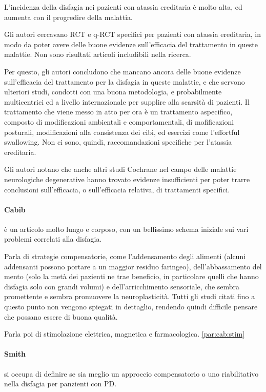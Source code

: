 L'incidenza della disfagia nei pazienti con atassia ereditaria è molto alta, ed 
aumenta con il progredire della malattia.

Gli autori cercavano RCT e q-RCT specifici per pazienti con atassia ereditaria, 
in modo da poter avere delle buone evidenze sull'efficacia del trattamento in 
queste malattie.
Non sono risultati articoli includibili nella ricerca.

Per questo, gli autori concludono che mancano ancora delle buone evidenze 
sull'efficacia del trattamento per la disfagia in queste malattie, e che 
servono ulteriori studi, condotti con una buona metodologia, e probabilmente 
multicentrici ed a livello internazionale per supplire alla scarsità di 
pazienti.
Il trattamento che viene messo in atto per ora è un trattamento aspecifico, 
composto di modificazioni ambientali e comportamentali, di mofificazioni 
posturali, modificazioni alla consistenza dei cibi, ed esercizi come 
l'effortful swallowing.
Non ci sono, quindi, raccomandazioni specifiche per l'atassia ereditaria.

Gli autori notano che anche altri studi Cochrane nel campo delle malattie 
neurologiche degenerative hanno trovato evidenze insufficienti per poter trarre 
conclusioni sull'efficacia, o sull'efficacia relativa, di trattamenti 
specifici. 

\paragraph{Cabib} \label{par:cab} \cite{Cabib2016} è un articolo molto lungo e 
corposo, con un bellissimo schema iniziale sui vari problemi correlati alla 
disfagia.

Parla di strategie compensatorie, come l'addensamento degli alimenti (alcuni 
addensanti possono portare a un maggior residuo faringeo), dell'abbassamento 
del mento (solo la metà dei pazienti ne trae beneficio, in particolare quelli 
che hanno disfagia solo con grandi volumi) e dell'arricchimento sensoriale, che 
sembra promettente e sembra promuovere la neuroplasticità.
Tutti gli studi citati fino a questo punto non vengono spiegati in dettaglio, 
rendendo quindi difficile pensare che possano essere di buona qualità.

Parla poi di stimolazione elettrica, magnetica e farmacologica. 
\ref{par:cab:stim}

\paragraph{Smith} \label{par:smi} \cite{Smith2012} si occupa di definire se sia 
meglio un approccio compensatorio o uno riabilitativo nella disfagia per 
panzienti con PD.

